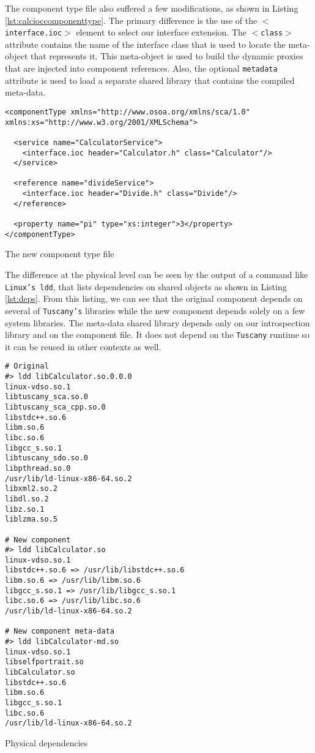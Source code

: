 The component type file also suffered a few modifications, as shown in Listing \ref{lst:calcioccomponenttype}.
The primary difference is the use of the \texttt{$<$interface.ioc$>$} element to select our interface extension.
The \texttt{$<$class$>$} attribute contains the name of the interface class that is used to locate the
meta-object that represents it. This meta-object is used to build the dynamic proxies that are injected into
component references. Also, the optional \texttt{metadata} attribute is used to load a separate shared library
that contains the compiled meta-data.

\begin{listing}
\begin{verbatim}
<componentType xmlns="http://www.osoa.org/xmlns/sca/1.0" xmlns:xs="http://www.w3.org/2001/XMLSchema">

  <service name="CalculatorService">
    <interface.ioc header="Calculator.h" class="Calculator"/>
  </service>

  <reference name="divideService">
    <interface.ioc header="Divide.h" class="Divide"/>
  </reference>
  
  <property name="pi" type="xs:integer">3</property>
</componentType>
\end{verbatim}
\caption{The new component type file}
\label{lst:calcioccomponenttype}
\end{listing}

The difference at the physical level can be seen by the output of a command like \texttt{Linux's ldd}, that lists
dependencies on shared objects as shown in Listing \ref{lst:deps}. From this listing, we can see that the original
component depends on several of \texttt{Tuscany's} libraries while the new component depends solely on a few system
libraries. The meta-data shared library depends only on our introspection library and on the component file. It does
not depend on the \texttt{Tuscany} runtime so it can be reused in other contexts as well.


\begin{listing}
\begin{verbatim}
# Original
#> ldd libCalculator.so.0.0.0 
linux-vdso.so.1
libtuscany_sca.so.0
libtuscany_sca_cpp.so.0
libstdc++.so.6
libm.so.6
libc.so.6
libgcc_s.so.1
libtuscany_sdo.so.0
libpthread.so.0
/usr/lib/ld-linux-x86-64.so.2
libxml2.so.2
libdl.so.2
libz.so.1
liblzma.so.5

# New component
#> ldd libCalculator.so 
linux-vdso.so.1
libstdc++.so.6 => /usr/lib/libstdc++.so.6
libm.so.6 => /usr/lib/libm.so.6
libgcc_s.so.1 => /usr/lib/libgcc_s.so.1
libc.so.6 => /usr/lib/libc.so.6
/usr/lib/ld-linux-x86-64.so.2

# New component meta-data
#> ldd libCalculator-md.so 
linux-vdso.so.1
libselfportrait.so
libCalculator.so
libstdc++.so.6
libm.so.6
libgcc_s.so.1
libc.so.6
/usr/lib/ld-linux-x86-64.so.2
 \end{verbatim}
\caption{Physical dependencies}
\label{lst:deps}
\end{listing}

